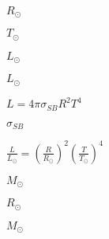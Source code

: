 \documentclass{article}
\begin{document}
$ R_{\odot} $
\pagebreak

$ T_{\odot} $
\pagebreak

$ L_{\odot}$
\pagebreak

$ L_{\odot} $
\pagebreak

$ L = 4\pi\sigma_{SB}R^2T^4 $
\pagebreak

$ \sigma_{SB} $
\pagebreak

$ \frac{L}{L_{\odot}} = \left( \frac{R}{R_{\odot}} \right)^2 \left( \frac{T}{T_{\odot}} \right)^4 $
\pagebreak

$ M_{\odot}$
\pagebreak

$ R_{\odot}$
\pagebreak

$ M_{\odot} $
\pagebreak
\end{document}
